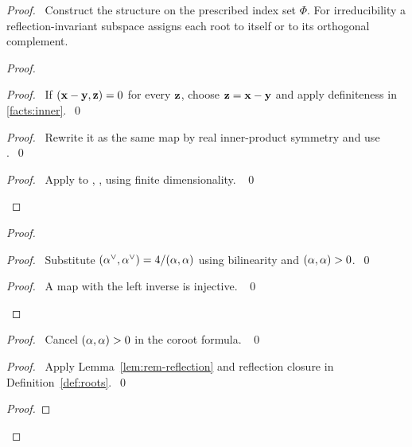 \begin{proof}
\pfsketch\ Construct the structure on the prescribed index set $\Phi$.
For irreducibility a reflection-invariant subspace assigns each root
to itself or to its orthogonal complement.
\begin{proof}
\begin{proof}\pf\ If $({\mathbf x}-{\mathbf y},{\mathbf z})=0$ for every ${\mathbf z}$, choose
${\mathbf z}={\mathbf x}-{\mathbf y}$ and apply definiteness in \ref{facts:inner}.~\qed\end{proof}
\begin{proof}\pf\ Rewrite it as the same map by real inner-product
symmetry and use .~\qed\end{proof}
\qedstep
\begin{proof}\pf\ Apply  to
, , using finite dimensionality. ~\qed\end{proof}
\end{proof}
\begin{proof}
\begin{proof}\pf\ Substitute $(\alpha^\vee,\alpha^\vee)=4/(\alpha,\alpha)$
using bilinearity and $(\alpha,\alpha)>0$.~\qed\end{proof}
\qedstep
\begin{proof}\pf\ A map with the left inverse  is injective. ~\qed\end{proof}
\end{proof}
\begin{proof}\pf\ Cancel $(\alpha,\alpha)>0$ in the coroot formula. ~\qed\end{proof}
\begin{proof}\pf\ Apply Lemma~\ref{lem:rem-reflection} and reflection
closure in Definition~\ref{def:roots}.~\qed\end{proof}
\begin{proof}

\end{proof}
\end{proof}
